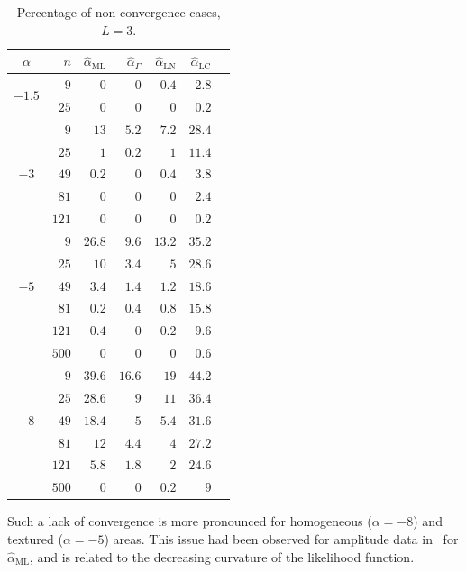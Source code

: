\documentclass[twocolumn]{svjour3}
\begin{document}
	\begin{table}[hbt]
		\caption{Percentage of non-convergence cases,  $L=3$.}\label{NoConvMLyNGyLNyLC_L=3}
		\centering
		\begin{tabular}{c*6{r}}
			\toprule        
			$\alpha$ & $n$ & $\widehat{\alpha}_{\text{{ML}}}$ & $\widehat{\alpha}_{\Gamma}$ & $\widehat{\alpha}_{\text{{LN}}}$ &  $\widehat{\alpha}_{\text{{LC}}}$\\
			\midrule
			\multirow{2 }{*}{$-1.5$} 
			&   $9$ & $0$ & $0$ & $0.4$ &  $2.8$\\
			&  $25$ & $0$ & $0$ & $0$ & $0.2$\\
			\midrule
			\multirow{5 }{*}{$-3$} 
			&   $9$ & $13$    & $5.2$  & $7.2$  &  $28.4$\\ 
			&  $25$ & $1$     & $0.2$  & $1$    &  $11.4$\\
			&  $49$ & $0.2$   & $0$    & $0.4$  & $3.8$\\ 
			&  $81$ & $0$     & $0$    & $0$    & $2.4$\\ 
			& $121$ & $0$     & $0$    & $0$    & $0.2$\\ 
			\midrule
			\multirow{5 }{*}{$-5$} 
			&   $9$ & $26.8$  & $9.6$  & $13.2$ &  $35.2$\\ 
			&  $25$ & $10$    & $3.4$  & $5$    & $28.6$\\ 
			&  $49$ & $3.4$   & $1.4$  & $1.2$  & $18.6$\\ 
			&  $81$ & $0.2$   & $0.4$  & $0.8$  & $15.8$\\ 
			& $121$ & $0.4$   & $0$    & $0.2$  & $9.6$\\ 
			& $500$ & $0$     & $0$    & $0$    & $0.6$\\ 
			\midrule
			\multirow{5 }{*}{$-8$} 
			&   $9$  & $39.6$ & $16.6$ & $19$   & $44.2$\\ 
			&  $25$  & $28.6$ & $9$    & $11$   & $36.4$\\ 
			&  $49$  & $18.4$ & $5$    & $5.4$  & $31.6$\\ 
			&  $81$  & $12$   & $4.4$  & $4$    & $27.2$\\ 
			& $121$  & $5.8$  & $1.8$  & $2$    & $24.6$\\ 
			& $500$  & $0$    & $0$    & $0.2$  & $9$\\
			\bottomrule     
		\end{tabular}
	\end{table}    
	
	Such a lack of convergence is more pronounced for homogeneous ($\alpha=-8$) and textured ($\alpha=-5$) areas. 
	This issue had been observed for amplitude data in~\cite{FreryCribariSouza:JASP:04} for $\widehat{\alpha}_{\text{{ML}}}$, and is related to the decreasing curvature of the likelihood function.
	
\end{document}
